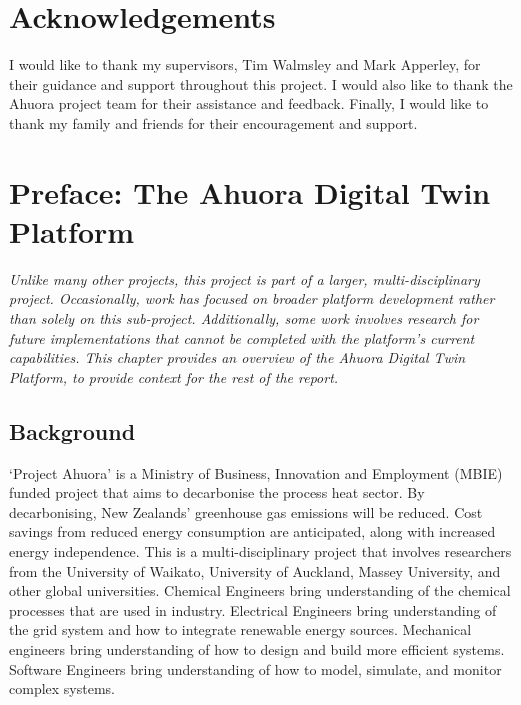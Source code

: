 \documentclass[12pt]{report}
\begin{document}

\chapter*{Acknowledgements}

I would like to thank my supervisors, Tim Walmsley and Mark Apperley, for their guidance and support throughout this project. I would also like to thank the Ahuora project team for their assistance and feedback. Finally, I would like to thank my family and friends for their encouragement and support.

\tableofcontents

\listoffigures

\listoftables

\newpage


\chapter{Preface: The Ahuora Digital Twin Platform}


\textit{ Unlike many other projects, this project is part of a larger, multi-disciplinary project. Occasionally, work has focused on broader platform development rather than solely on this sub-project. Additionally, some work involves research for future implementations that cannot be completed with the platform's current capabilities. This chapter provides an overview of the Ahuora Digital Twin Platform, to provide context for the rest of the report.}

\section{Background}

`Project Ahuora' is a Ministry of Business, Innovation and Employment (MBIE) funded project that aims to decarbonise the process heat sector.
By decarbonising, New Zealands' greenhouse gas emissions will be reduced. Cost savings from reduced energy consumption are anticipated, along with increased energy independence.
This is a multi-disciplinary project that involves researchers from the University of Waikato, University of Auckland, Massey University,
and other global universities. Chemical Engineers bring understanding of the chemical processes that are used in industry. Electrical Engineers bring understanding of the grid system
and how to integrate renewable energy sources. Mechanical engineers bring understanding of how to design and build more efficient systems. Software Engineers bring understanding of how to
model, simulate, and monitor complex systems.
\end{document}
